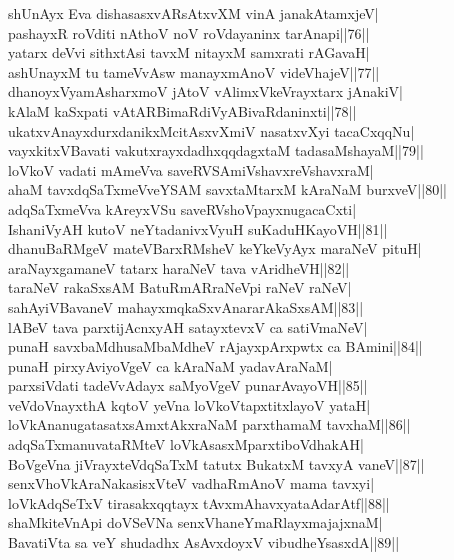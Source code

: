 \documentclass{article}
\begin{document}
shUnAyx Eva dishasasxvARsAtxvXM vinA janakAtamxjeV|\\
pashayxR roVditi nAthoV noV roVdayaninx tarAnapi||76||\\
yatarx deVvi sithxtAsi tavxM nitayxM samxrati rAGavaH|\\
ashUnayxM tu tameVvAsw manayxmAnoV videVhajeV||77||\\
dhanoyxVyamAsharxmoV jAtoV vAlimxVkeVrayxtarx jAnakiV|\\
kAlaM kaSxpati vAtARBimaRdiVyABivaRdaninxti||78||\\
ukatxvAnayxdurxdanikxMcitAsxvXmiV nasatxvXyi tacaCxqqNu|\\
vayxkitxVBavati vakutxrayxdadhxqqdagxtaM tadasaMshayaM||79||\\
loVkoV vadati mAmeVva saveRVSAmiVshavxreVshavxraM|\\
ahaM tavxdqSaTxmeVveYSAM savxtaMtarxM kAraNaM burxveV||80||\\
adqSaTxmeVva kAreyxVSu saveRVshoVpayxnugacaCxti|\\
IshaniVyAH kutoV neYtadanivxVyuH suKaduHKayoVH||81||\\
dhanuBaRMgeV mateVBarxRMsheV keYkeVyAyx maraNeV pituH|\\
araNayxgamaneV tatarx haraNeV tava vAridheVH||82||\\
taraNeV rakaSxsAM BatuRmARraNeVpi raNeV raNeV|\\
sahAyiVBavaneV mahayxmqkaSxvAnararAkaSxsAM||83||\\
lABeV tava parxtijAcnxyAH satayxtevxV ca satiVmaNeV|\\
punaH savxbaMdhusaMbaMdheV rAjayxpArxpwtx ca BAmini||84||\\
punaH pirxyAviyoVgeV ca kAraNaM yadavAraNaM|\\
parxsiVdati tadeVvAdayx saMyoVgeV punarAvayoVH||85||\\
veVdoVnayxthA kqtoV yeVna loVkoVtapxtitxlayoV yataH|\\
loVkAnanugatasatxsAmxtAkxraNaM parxthamaM tavxhaM||86||\\
adqSaTxmanuvataRMteV loVkAsasxMparxtiboVdhakAH|\\
BoVgeVna jiVrayxteVdqSaTxM tatutx BukatxM tavxyA vaneV||87||\\
senxVhoVkAraNakasisxVteV vadhaRmAnoV mama tavxyi|\\
loVkAdqSeTxV tirasakxqqtayx tAvxmAhavxyataAdarAtf||88||\\
shaMkiteVnApi doVSeVNa senxVhaneYmaRlayxmajajxnaM|\\
BavatiVta sa veY shudadhx AsAvxdoyxV vibudheYsasxdA||89||\\
\end{document}
